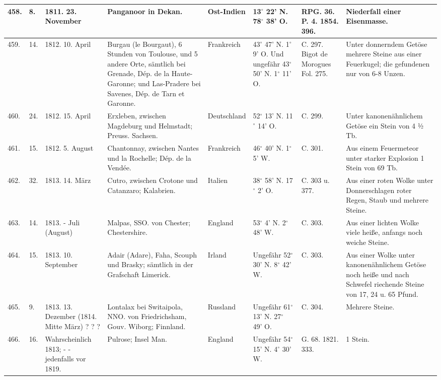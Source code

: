 \documentclass[a4paper, 11pt, oneside, polutonikogreek, german]{article}
\begin{document}
\begin{table}[!ht]
\begin{tabular}{|l|l|l|l|l|l|l|l|}
        458. & 8. & 1811. 23. November & Panganoor in Dekan. & Ost-Indien & 13$^\circ$ 22' N. 78$^\circ$ 38' O. & RPG. 36. P. 4. 1854. 396. & Niederfall einer Eisenmasse. \\ \hline
        459. & 14. & 1812. 10. April & Burgau (le Bourgaut), 6 Stunden von Toulouse, und 5 andere Orte, sämtlich bei Grenade, Dép. de la Haute-Garonne; und Las-Pradere bei Savenes, Dép. de Tarn et Garonne. & Frankreich & 43$^\circ$ 47' N. 1$^\circ$ 9' O. Und ungefähr 43$^\circ$ 50' N. 1$^\circ$ 11' O. & C. 297. Bigot de Morogues Fol. 275. & Unter donnerndem Getöse mehrere Steine aus einer Feuerkugel; die gefundenen nur von 6-8 Unzen. \\ \hline
        460. & 24. & 1812. 15. April & Erxleben, zwischen Magdeburg und Helmstadt; Preuss. Sachsen. & Deutschland & 52$^\circ$ 13' N. 11$^\circ$ 14' O. & C. 299. & Unter kanonenähnlichem Getöse ein Stein von 4 ½ Tb. \\ \hline
        461. & 15. & 1812. 5. August & Chantonnay, zwischen Nantes und la Rochelle; Dép. de la Vendée. & Frankreich & 46$^\circ$ 40' N. 1$^\circ$ 5' W. & C. 301. & Aus einem Feuermeteor unter starker Explosion 1 Stein von 69 Tb. \\ \hline
        462. & 32. & 1813. 14. März & Cutro, zwischen Crotone und Catanzaro; Kalabrien. & Italien & 38$^\circ$ 58' N. 17$^\circ$ 2' O. & C. 303 u. 377. & Aus einer roten Wolke unter Donnerschlagen roter Regen, Staub und mehrere Steine. \\ \hline
        463. & 14. & 1813. - Juli (August) & Malpas, SSO. von Chester; Chestershire. & England & 53$^\circ$ 4' N. 2$^\circ$ 48' W. & C. 303. & Aus einer lichten Wolke viele heiße, anfangs noch weiche Steine. \\ \hline
        464. & 15. & 1813. 10. September & Adair (Adare), Faha, Scouph und Brasky; sämtlich in der Grafschaft Limerick. & Irland & Ungefähr 52$^\circ$ 30' N. 8$^\circ$ 42' W. & C. 303. & Aus einer Wolke unter kanonenähnlichem Getöse noch heiße und nach Schwefel riechende Steine von 17, 24 u. 65 Pfund. \\ \hline
        465. & 9. & 1813. 13. Dezember (1814. Mitte März) ? ? ? & Lontalax bei Switaipola, NNO. von Friedrichsham, Gouv. Wiborg; Finnland. & Russland & Ungefähr 61$^\circ$ 13' N. 27$^\circ$ 49' O. & C. 304. & Mehrere Steine. \\ \hline
        466. & 16. & Wahrscheinlich 1813; - - jedenfalls vor 1819. & Pulrose; Insel Man. & England & Ungefähr 54$^\circ$ 15' N. 4$^\circ$ 30' W. & G. 68. 1821. 333. & 1 Stein. \\ \hline

\end{tabular}
\end{table}
\end{document}
